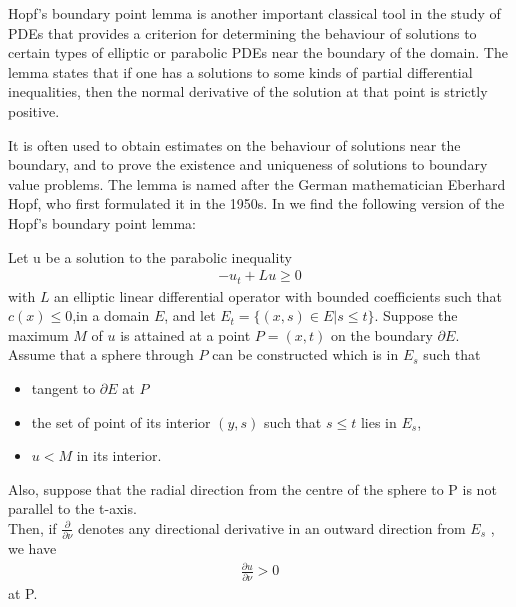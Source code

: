 Hopf's boundary point lemma is another important classical tool in the study of PDEs that provides a criterion for determining the behaviour of solutions to certain types of elliptic or parabolic PDEs near the boundary of the domain. The lemma states that if one has a solutions to some kinds of partial differential inequalities, then the normal derivative of the solution at that point is strictly positive.

It is often used to obtain estimates on the behaviour of solutions near the boundary, and to prove the existence and uniqueness of solutions to boundary value problems. The lemma is named after the German mathematician Eberhard Hopf, who first formulated it in the 1950s. In \cite{protterweinberger} we find the following version of the Hopf's boundary point lemma:

\begin{theorem}
	Let u be a solution to the parabolic inequality 
	\begin{align*}
		-u_t+Lu\geq 0
	\end{align*} 
	with $L$ an elliptic linear differential operator with bounded coefficients such that $c(x)\leq 0$,in a domain $E$, and let $E_t = \{(x, s) \in E | s \leq t\}$. Suppose the maximum $M$ of $u$ is attained at a point $P=(x, t)$ on the boundary $\partial E$. \\
	Assume that a sphere through $P$ can be constructed which is in $E_s$ such that
	\begin{itemize}\itemsep0em 
		\item tangent to $\partial E$ at $P$
		\item the set of point of its interior $(y, s)$ such that $s\leq t$ lies in $E_s$, 
		\item  $u < M$ in its interior.
	\end{itemize}	
	Also, suppose that the radial direction from the centre of the sphere to P is not parallel to the t-axis. \\
	Then, if $\frac{\partial}{\partial \nu}$ denotes any directional derivative in an outward direction from $E_s$ , we have
	\begin{align*}
		\frac{\partial u}{\partial \nu} > 0
	\end{align*}
	at P.\label{HopfBPL}
\end{theorem}

